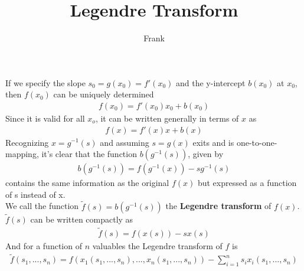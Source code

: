 \documentclass{article}
\title{Legendre Transform }
\author{Frank}
\begin{document}
\maketitle
If we specify the slope $s_0=g(x_0)=f'(x_0)$ and the y-intercept $b(x_0)$ at $x_0$, then $f(x_0)$ can be uniquely determined
\begin{align}
f(x_0)=f'(x_0)x_0+b(x_0)
\end{align}
Since it is valid for all $x_o$, it can be written generally in terms of $x$ as
\begin{align}
f(x)=f'(x)x+b(x)
\end{align}
Recognizing $x=g^{-1}(s)$ and assuming $s=g(x)$ exits and is one-to-one-mapping, it's clear that the function $b(g^{-1}(s))$, given by
\begin{align}
b(g^{-1}(s))=f(g^{-1}(x))-sg^{-1}(s)
\end{align}
contains the same information as the original $f(x)$ but expressed as a function of s instead of x.\\
We call the function $\tilde{f}(s)=b(g^{-1}(s))$ the \textbf{Legendre transform} of $f(x)$.\\
$\tilde{f}(s)$ can be written compactly as
\begin{align}
\tilde{f}(s)=f(x(s))-sx(s)
\end{align}
And for a function of $n$ valuables the Legendre transform of $f$ is
\begin{align}
\tilde{f}(s_1,...,s_n)=f(x_1(s_1,...,s_n),...,x_n(s_1,...,s_n))-\sum^n_{i=1}s_ix_i(s_1,...,s_n)
\end{align}
\end{document}
